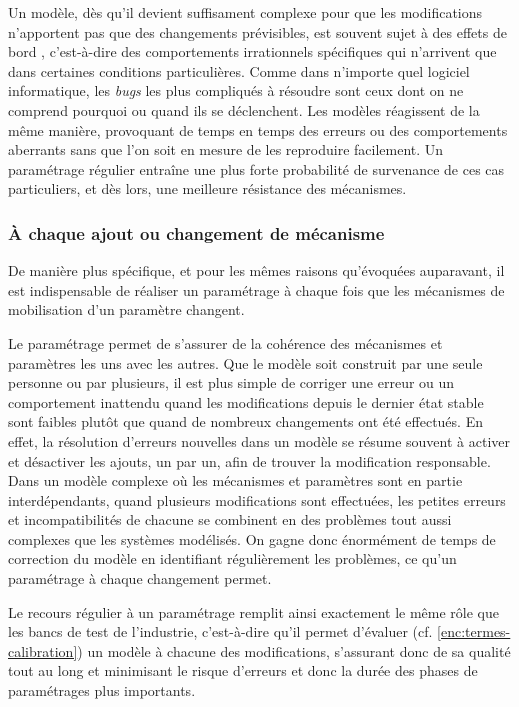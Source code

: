 \documentclass[12pt, a4paper, oneside]{book}
\begin{document}
Un modèle, dès qu'il devient suffisament complexe pour que les modifications n'apportent pas que des changements prévisibles, est souvent sujet à des \og effets de bord \fg{}, c'est-à-dire des comportements irrationnels spécifiques qui n'arrivent que dans certaines conditions particulières.
Comme dans n'importe quel logiciel informatique, les \textit{bugs} les plus compliqués à résoudre sont ceux dont on ne comprend pourquoi ou quand ils se déclenchent.
Les modèles réagissent de la même manière, provoquant de temps en temps des erreurs ou des comportements aberrants sans que l'on soit en mesure de les reproduire facilement. Un paramétrage régulier entraîne une plus forte probabilité de survenance de ces cas particuliers, et dès lors, une meilleure résistance des mécanismes.

\subsubsection{À chaque ajout ou changement de mécanisme}

De manière plus spécifique, et pour les mêmes raisons qu'évoquées auparavant, il est indispensable de réaliser un paramétrage à chaque fois que les mécanismes de mobilisation d'un paramètre changent.

Le paramétrage permet de s'assurer de la cohérence des mécanismes et paramètres les uns avec les autres.
Que le modèle soit construit par une seule personne ou par plusieurs, il est plus simple de corriger une erreur ou un comportement inattendu quand les modifications depuis le dernier état stable sont faibles plutôt que quand de nombreux changements ont été effectués.
En effet, la résolution d'erreurs nouvelles dans un modèle se résume souvent à activer et désactiver les ajouts, un par un, afin de trouver la modification responsable.
Dans un modèle complexe où les mécanismes et paramètres sont en partie interdépendants, quand plusieurs modifications sont effectuées, les petites erreurs et incompatibilités de chacune se combinent en des problèmes tout aussi complexes que les systèmes modélisés.
On gagne donc énormément de temps de correction du modèle en identifiant régulièrement les problèmes, ce qu'un paramétrage à chaque changement permet.

Le recours régulier à un paramétrage remplit ainsi exactement le même rôle que les \og bancs de test\fg{} de l'industrie, c'est-à-dire qu'il permet d'évaluer (cf. \cref{enc:termes-calibration}) un modèle à chacune des modifications, s'assurant donc de sa qualité tout au long et minimisant le risque d'erreurs et donc la durée des phases de paramétrages plus importants.
\end{document}
